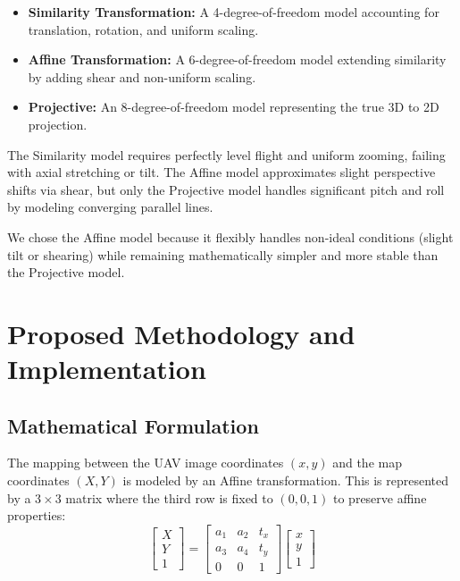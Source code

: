 \documentclass[conference]{IEEEtran}
\begin{document}
\begin{itemize}
    \item \textbf{Similarity Transformation:} A 4-degree-of-freedom model accounting for translation, rotation, and uniform scaling.
    \item \textbf{Affine Transformation:} A 6-degree-of-freedom model extending similarity by adding shear and non-uniform scaling.
    \item \textbf{Projective:} An 8-degree-of-freedom model representing the true 3D to 2D projection.
\end{itemize}

The Similarity model requires perfectly level flight and uniform zooming, failing with axial stretching or tilt. The Affine model approximates slight perspective shifts via shear, but only the Projective model handles significant pitch and roll by modeling converging parallel lines. 

We chose the Affine model because it flexibly handles non-ideal conditions (slight tilt or shearing) while remaining mathematically simpler and more stable than the Projective model.


\section{Proposed Methodology and Implementation}

\subsection{Mathematical Formulation}
The mapping between the UAV image coordinates $(x, y)$ and the map coordinates $(X, Y)$ is modeled by an Affine transformation. This is represented by a $3 \times 3$ matrix where the third row is fixed to $(0, 0, 1)$ to preserve affine properties:
\begin{equation}
\begin{bmatrix} X \\ Y \\ 1 \end{bmatrix} = \begin{bmatrix} a_1 & a_2 & t_x \\ a_3 & a_4 & t_y \\ 0 & 0 & 1 \end{bmatrix} \begin{bmatrix} x \\ y \\ 1 \end{bmatrix}
\end{equation}
\end{document}

